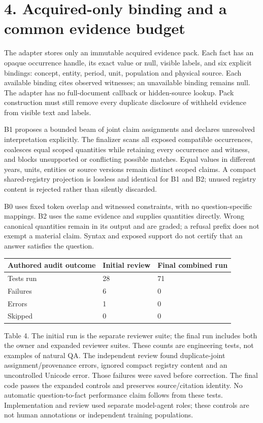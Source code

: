 \documentclass[10pt,a4paper]{article}
\begin{document}
\clearpage
\section*{4. Acquired-only binding and a common evidence budget}
The adapter stores only an immutable acquired evidence pack. Each fact has an opaque occurrence handle, its exact value or null, visible labels, and six explicit bindings: concept, entity, period, unit, population and physical source. Each available binding cites observed witnesses; an unavailable binding remains null. The adapter has no full-document callback or hidden-source lookup. Pack construction must still remove every duplicate disclosure of withheld evidence from visible text and labels.

B1 proposes a bounded beam of joint claim assignments and declares unresolved interpretation explicitly. The finalizer scans all exposed compatible occurrences, coalesces equal scoped quantities while retaining every occurrence and witness, and blocks unsupported or conflicting possible matches. Equal values in different years, units, entities or source versions remain distinct scoped claims. A compact shared-registry projection is lossless and identical for B1 and B2; unused registry content is rejected rather than silently discarded.

B0 uses fixed token overlap and witnessed constraints, with no question-specific mappings. B2 uses the same evidence and supplies quantities directly. Wrong canonical quantities remain in its output and are graded; a refusal prefix does not exempt a material claim. Syntax and exposed support do not certify that an answer satisfies the question.

\begin{longtable}{@{}p{}p{}p{}@{}}\toprule
\textbf{Authored audit outcome} & \textbf{Initial review} & \textbf{Final combined run} \\ \midrule\endhead
Tests run & 28 & 71 \\
Failures & 6 & 0 \\
Errors & 1 & 0 \\
Skipped & 0 & 0 \\
\bottomrule\end{longtable}
{\small Table 4. The initial run is the separate reviewer suite; the final run includes both the owner and expanded reviewer suites. These counts are engineering tests, not examples of natural QA.}
The independent review found duplicate-joint assignment/provenance errors, ignored compact registry content and an uncontrolled Unicode error. Those failures were saved before correction. The final code passes the expanded controls and preserves source/citation identity. No automatic question-to-fact performance claim follows from these tests. Implementation and review used separate model-agent roles; these controls are not human annotations or independent training populations.
\end{document}
